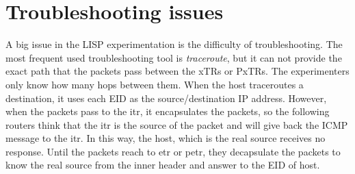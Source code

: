 \section{Troubleshooting issues}
\label{sec:troubleshooting}
A big issue in the LISP experimentation is the difficulty of troubleshooting. The most frequent used troubleshooting tool is \emph{traceroute}, but it can not provide the exact path that the packets pass between the xTRs or PxTRs. The experimenters only know how many hops between them. When the host traceroutes a destination, it uses each EID as the source/destination IP address. However, when the packets pass to the \acrshort{itr}, it encapsulates the packets, so the following routers think that the \acrshort{itr} is the source of the packet and will give back the ICMP message to the \acrshort{itr}. In this way, the host, which is the real source receives no response. Until the packets reach to \acrshort{etr} or \acrshort{petr}, they decapsulate the packets to know the real source from the inner header and answer to the EID of host.

